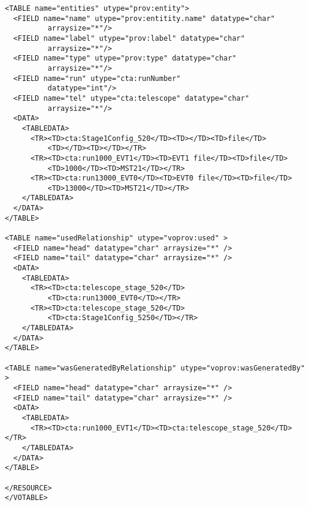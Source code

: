 \begin{itemize}
\begin{verbatim}
<TABLE name="entities" utype="prov:entity">
  <FIELD name="name" utype="prov:entitity.name" datatype="char" 
          arraysize="*"/>
  <FIELD name="label" utype="prov:label" datatype="char" 
          arraysize="*"/>
  <FIELD name="type" utype="prov:type" datatype="char" 
          arraysize="*"/>
  <FIELD name="run" utype="cta:runNumber" 
          datatype="int"/>
  <FIELD name="tel" utype="cta:telescope" datatype="char" 
          arraysize="*"/>
  <DATA>
    <TABLEDATA>
      <TR><TD>cta:Stage1Config_520</TD><TD></TD><TD>file</TD>
          <TD></TD><TD></TD></TR>
      <TR><TD>cta:run1000_EVT1</TD><TD>EVT1 file</TD><TD>file</TD>
          <TD>1000</TD><TD>MST21</TD></TR>
      <TR><TD>cta:run13000_EVT0</TD><TD>EVT0 file</TD><TD>file</TD>
          <TD>13000</TD><TD>MST21</TD></TR>
    </TABLEDATA>
  </DATA>
</TABLE>

<TABLE name="usedRelationship" utype="voprov:used" >
  <FIELD name="head" datatype="char" arraysize="*" />
  <FIELD name="tail" datatype="char" arraysize="*" />
  <DATA>
    <TABLEDATA>
      <TR><TD>cta:telescope_stage_520</TD>
          <TD>cta:run13000_EVT0</TD></TR>
      <TR><TD>cta:telescope_stage_520</TD>
          <TD>cta:Stage1Config_5250</TD></TR>
    </TABLEDATA>
  </DATA>
</TABLE>

<TABLE name="wasGeneratedByRelationship" utype="voprov:wasGeneratedBy" >
  <FIELD name="head" datatype="char" arraysize="*" />
  <FIELD name="tail" datatype="char" arraysize="*" />
  <DATA>
    <TABLEDATA>
      <TR><TD>cta:run1000_EVT1</TD><TD>cta:telescope_stage_520</TD></TR>
    </TABLEDATA>
  </DATA>
</TABLE>

</RESOURCE>
</VOTABLE>
\end{verbatim}
  
  
\end{itemize}


